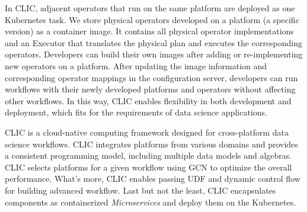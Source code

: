 \iffalse
In CLIC, adjacent operators that run on the same platform are deployed as one Kubernetes task. We store physical operators developed on a platform (a specific version) as a container image. It contains all physical operator implementations and an Executor that translates the physical plan and executes the corresponding operators. Developers can build their own images after adding or re-implementing new operators on a platform. After updating the image information and corresponding operator mappings in the configuration server, developers can run workflows with their newly developed platforms and operators without affecting other workflows. In this way, CLIC enables flexibility in both development and deployment, which fits for the requirements of data science applications.

CLIC is a cloud-native computing framework designed for cross-platform data science workflows. CLIC integrates platforms from various domains and provides a consistent programming model, including multiple data models and algebras. CLIC selects platforms for a given workflow using GCN to optimize the overall performance. What’s more, CLIC enables passing UDF and dynamic control flow for building advanced workflow. Last but not the least, CLIC encapsulates components as containerized \textit{Microservices} and deploy them on the Kubernetes.

